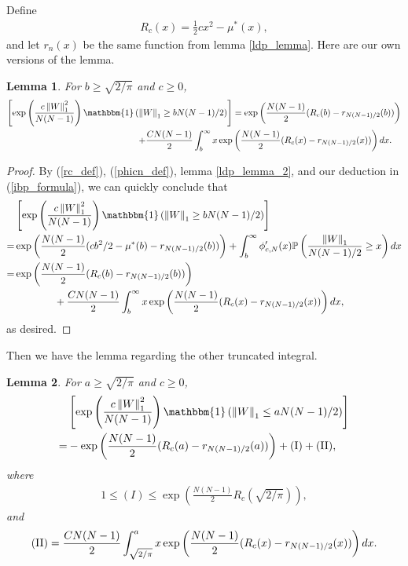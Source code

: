 \documentclass[10pt]{article}
\newcommand{\p}{\mathbb{P}}
\newcommand{\norm}[1]{\left\lVert#1\right\rVert}
\newtheorem{lemma}{\bf Lemma}
\newenvironment{Proof of lemma}{\noindent{\bf Proof of Lemma}}{\hfill$\Box$\newline}
\newenvironment{Proof of claim}{\noindent{\bf Proof of claim}}{\hfill$\Box$\newline}
\newenvironment{Proof of theorem}{\noindent{\bf Proof of Theorem}}{\hfill\scriptsize{$\Box$}\newline}
\newenvironment{Proof of theorems}{\noindent{\bf Proof of Theorems}}{\hfill$\Box$\newline}
\newenvironment{Proof of proposition}{\noindent{\bf Proof of Proposition}}{\hfill$\Box$\newline}
\newenvironment{Proof of propositions}{\noindent{\bf Proof of Propositions}}{\hfill$\Box$\newline}
\newenvironment{Proof of exercise}{\noindent{\it Proof of Exercise:}}{\hfill$\Box$}
\numberwithin{equation}{section}
\begin{document}
    Define
    \begin{align} \label{rc_def}
        R_c(x) = \frac{1}{2}cx^2 - \mu^*(x),
    \end{align}
and let $r_n(x)$ be the same function from lemma \ref{ldp_lemma}. Here are our own versions of the lemma.
\begin{lemma} \label{trunc_lemma_1}
For $b \geq \sqrt{2/ \pi}$ and $c \geq 0$,
    \begin{align}
        \left[ \exp \left(\frac{c\norm{W}^2_1}{N(N-1)}\right) \mathbbm{1}\left(\norm{W}_1 \geq bN(N-1)/2\right)\right] &= \exp\left(\frac{N(N-1)}{2}(R_c(b)-r_{N(N-1)/2}(b))\right) \nonumber \\
        + \frac{CN(N-1)}{2}\int_{b}^{\infty}x \exp &\left(\frac{N(N-1)}{2}(R_c(x)-r_{N(N-1)/2}(x))\right)dx.
    \end{align}
\end{lemma}
\begin{proof}
    By (\ref{rc_def}), (\ref{phicn_def}), lemma \ref{ldp_lemma_2}, and our deduction in (\ref{ibp_formula}), we can quickly conclude that
    \begin{align}
        &\left[ \exp \left(\frac{c\norm{W}^2_1}{N(N-1)}\right) \mathbbm{1}\left(\norm{W}_1 \geq bN(N-1)/2\right)\right] \nonumber \\
        =& \exp\left(\frac{N(N-1)}{2}(cb^2/2-\mu^*(b)-r_{N(N-1)/2}(b))\right) + \int_{b}^{\infty} \phi_{c,N}'(x) \p\left(\frac{\norm{W}_1}{N(N-1)/2} \geq x\right)dx \nonumber \\
        =& \exp\left(\frac{N(N-1)}{2}(R_c(b)-r_{N(N-1)/2}(b))\right)  \nonumber \\
        & \quad \quad \quad \quad+\frac{CN(N-1)}{2}\int_{b}^{\infty}x \exp\left(\frac{N(N-1)}{2}(R_c(x)-r_{N(N-1)/2}(x))\right)dx, \nonumber
    \end{align}
    as desired.
\end{proof}
Then we have the lemma regarding the other truncated integral.
\begin{lemma} \label{trunc_lemma_2}
    For $a \geq \sqrt{2/ \pi}$ and $c \geq 0$,
    \begin{align}
        &\left[ \exp \left(\frac{c\norm{W}^2_1}{N(N-1)}\right) \mathbbm{1}\left(\norm{W}_1 \leq aN(N-1)/2\right)\right] \nonumber \\
        =& -\exp\left(\frac{N(N-1)}{2}(R_c(a)-r_{N(N-1)/2}(a))\right) + \text{\normalfont (I)} + \text{\normalfont (II)},
    \end{align}
    where
    \begin{align}
        1 \leq (I) \leq \exp\left(\frac{N(N-1)}{2}R_c(\sqrt{2/ \pi})\right),
    \end{align}
    and
    \begin{align}
        \text{\normalfont (II)} = \frac{CN(N-1)}{2}\int_{\sqrt{2/\pi}}^{a}x \exp\left(\frac{N(N-1)}{2}(R_c(x)-r_{N(N-1)/2}(x))\right)dx.
    \end{align}
\end{lemma}
\end{document}

